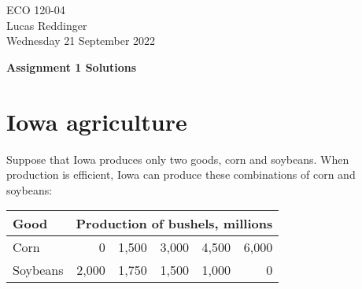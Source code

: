 \documentclass[
    letterpaper,paper=portrait,fleqn,
    DIV=16,fontsize=12pt,twoside=semi,
    parskip=full-,
    headings=standardclasses]
{scrartcl}
\begin{document}
\RaggedRight
\thispagestyle{plain}

ECO 120-04 \\
Lucas Reddinger \\
Wednesday 21 September 2022

\vspace{0.7\baselineskip}
\textbf{\LARGE Assignment 1 Solutions}

\section*{Iowa agriculture}

Suppose that Iowa produces only two goods, corn and soybeans. When production is efficient, Iowa can produce these combinations of corn and soybeans:

{\footnotesize\begin{tabular}{lrrrrr}
\toprule
Good & \multicolumn{5}{c}{Production of bushels, millions} \\
\midrule
Corn     & 0 & 1,500 & 3,000 & 4,500 & 6,000 \\
Soybeans & 2,000 & 1,750 & 1,500 & 1,000 & 0 \\
\bottomrule
\end{tabular}}
\end{document}
